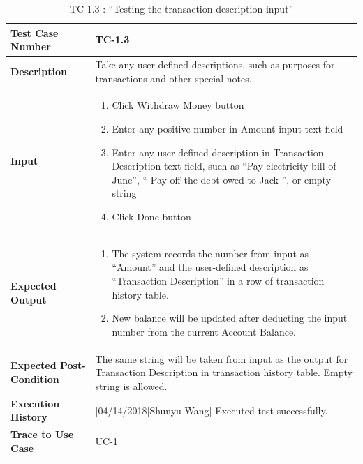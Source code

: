 \documentclass[12pt]{article}
\begin{document}
\begin{table}[H]
\caption{TC-1.3 : “Testing the transaction description input”}
\begin{center}
\begin{tabular}{|p{5.5	cm}|p{11cm}|}
\hline
\bf Test Case Number & 
TC-1.3 \\
\hline
\bf Description & 
Take any user-defined descriptions, such as purposes for transactions and other special notes.\\
\hline
\bf Input & 
\begin{enumerate}
  \item Click Withdraw Money button
  \item Enter any positive number in Amount input text field
  \item Enter any user-defined description in Transaction Description text field, such as “Pay electricity bill of June”, “ Pay off the debt owed to Jack
”, or empty string
  \item Click Done button
\end{enumerate} \\
\hline
\bf Expected Output & 
\begin{enumerate}
  \item The system records the number from input as “Amount” and the user-defined description as “Transaction Description” in a row of transaction history table.
  \item New balance will be updated after deducting the input number from the current Account Balance.
\end{enumerate} \\
\hline
\bf Expected Post-Condition & 
The same string will be taken from input as the output for Transaction Description in transaction history table. Empty string is allowed.\\
\hline
\bf Execution History & 
[04/14/2018|Shunyu Wang] Executed test successfully.\\
\hline
\bf Trace to Use Case & 
UC-1\\
\hline

\end{tabular}
\end{center}
\end{table}
\end{document}
